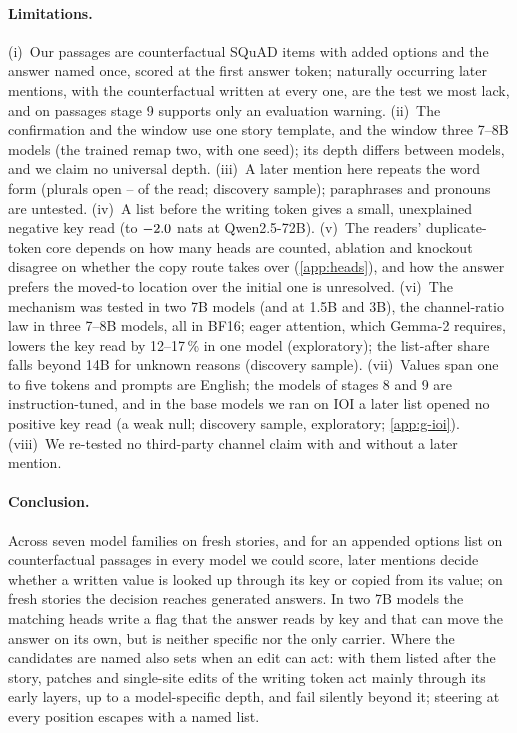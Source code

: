 \paragraph{Limitations.}\label{sec:limitations}
(i)~Our passages are counterfactual SQuAD items with added options and the answer named once, scored at the first answer token; naturally occurring later mentions, with the counterfactual written at every one, are the test we most lack, and on passages stage 9 supports only an evaluation warning. (ii)~The confirmation and the window use one story template, and the window three 7--8B models (the trained remap two, with one seed); its depth differs between models, and we claim no universal depth. (iii)~A later mention here repeats the word form (plurals open \GfourteenPluralMin--\GfourteenPluralMax{} of the read; discovery sample); paraphrases and pronouns are untested. (iv)~A list before the writing token gives a small, unexplained negative key read (to $-2.0$ nats at Qwen2.5-72B). (v)~The readers' duplicate-token core depends on how many heads are counted, ablation and knockout disagree on whether the copy route takes over (\cref{app:heads}), and how the answer prefers the moved-to location over the initial one is unresolved. (vi)~The mechanism was tested in two 7B models (and at 1.5B and 3B), the channel-ratio law in three 7--8B models, all in BF16; eager attention, which Gemma-2 requires, lowers the key read by 12--17\,\% in one model (exploratory); the list-after share falls beyond 14B for unknown reasons (discovery sample). %
(vii)~Values span one to five tokens and prompts are English; the models of stages 8 and 9 are instruction-tuned, and in the base models we ran on IOI a later list opened no positive key read (a weak null; discovery sample, exploratory; \cref{app:g-ioi}). (viii)~We re-tested no third-party channel claim with and without a later mention.

\paragraph{Conclusion.}
Across seven model families on fresh stories, and for an appended options list on counterfactual passages in every model we could score, later mentions decide whether a written value is looked up through its key or copied from its value; on fresh stories the decision reaches generated answers. %
In two 7B models the matching heads write a flag that the answer reads by key and that can move the answer on its own, but is neither specific nor the only carrier. Where the candidates are named also sets when an edit can act: with them listed after the story, patches and single-site edits of the writing token act mainly through its early layers, up to a model-specific depth, and fail silently beyond it; steering at every position escapes with a named list.
